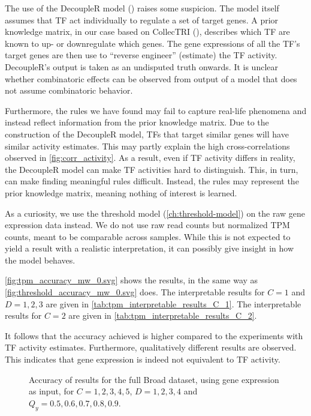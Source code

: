 The use of the DecoupleR model (\cite{badia-i-mompel_decoupler_2022, badia-i-mompel_transcription_nodate}) raises some suspicion.
The model itself assumes that TF act individually to regulate a set of target genes.
A prior knowledge matrix, in our case based on CollecTRI (\cite{muller-dott_expanding_2023}),
describes which TF are known to up- or downregulate which genes.
The gene expressions of all the TF's target genes are then use to ``reverse engineer'' (estimate) the TF activity.
DecoupleR's output is taken as an undisputed truth onwards.
It is unclear whether combinatoric effects can be observed from output of a model that does not assume combinatoric behavior.

Furthermore, the rules we have found may fail to capture real-life phenomena
and instead reflect information from the prior knowledge matrix.
Due to the construction of the DecoupleR model, TFs that target similar genes will have similar activity estimates.
This may partly explain the high cross-correlations observed in \autoref{fig:corr_activity}.
As a result, even if TF activity differs in reality,
the DecoupleR model can make TF activities hard to distinguish.
This, in turn, can make finding meaningful rules difficult.
Instead, the rules may represent the prior knowledge matrix, meaning nothing of interest is learned.

As a curiosity, we use the threshold model (\autoref{ch:threshold-model}) on the raw gene expression data instead.
We do not use raw read counts but normalized TPM counts, meant to be comparable across samples.
While this is not expected to yield a result with a realistic interpretation,
it can possibly give insight in how the model behaves.

\autoref{fig:tpm_accuracy_mw_0.svg} shows the results, in the same way as \autoref{fig:threshold_accuracy_mw_0.svg} does.
The interpretable results for $C=1$ and $D=1,2,3$ are given in \autoref{tab:tpm_interpretable_results_C_1}.
The interpretable results for $C=2$ are given in \autoref{tab:tpm_interpretable_results_C_2}.

It follows that the accuracy achieved is higher compared to the experiments with TF activity estimates.
Furthermore, qualitatively different results are observed.
This indicates that gene expression is indeed not equivalent to TF activity.

\begin{figure}[h]
    \centering
    
    \caption{Accuracy of results for the full Broad dataset, using gene expression as input, for $C=1,2,3,4,5$, $D=1,2,3,4$ and $Q_y=0.5,0.6,0.7,0.8,0.9.$}
    \label{fig:tpm_accuracy_mw_0.svg}
\end{figure}

